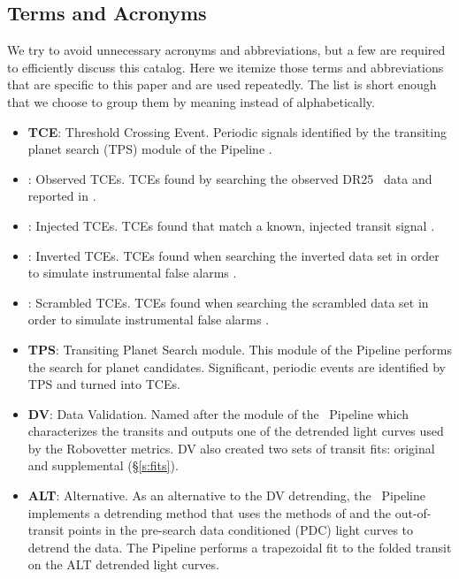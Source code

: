 \subsection{Terms and Acronyms}
\label{abbrev}
We try to avoid unnecessary acronyms and abbreviations, but a few are required to efficiently discuss this catalog.  Here we itemize those terms and abbreviations that are specific to this paper and are used repeatedly. The list is short enough that we choose to group them by meaning instead of alphabetically. 

\begin{itemize}

\item[] \textbf{TCE}: Threshold Crossing Event. Periodic signals identified by the transiting planet search (TPS) module of the \Kepler{} Pipeline \citep{JenkinsKDPH}.
\item[] \textbf{\opstce}: Observed TCEs. TCEs found by searching the observed DR25 \Kepler\ data and reported in \citet{Twicken2016}.
\item[] \textbf{\injtce}: Injected TCEs. TCEs found that match a known, injected transit signal \citep{Christiansen2017}.
\item[] \textbf{\invtce}: Inverted TCEs. TCEs found when searching the inverted data set in order to simulate instrumental false alarms \citep{Coughlin2017a}.
\item[] \textbf{\scrtce}: Scrambled TCEs. TCEs found when searching the scrambled data set in order to simulate instrumental false alarms \citep{Coughlin2017a}.
\item[] \textbf{TPS}: Transiting Planet Search module. This module of the \Kepler{} Pipeline performs the search for planet candidates. Significant, periodic events are identified by TPS and turned into TCEs.
\item[] \textbf{DV}: Data Validation. Named after the module of the \Kepler\ Pipeline \citep{JenkinsKDPH} which characterizes the transits and outputs one of the detrended light curves used by the Robovetter metrics.  DV also created two sets of transit fits: original and supplemental (\S\ref{s:fits}).
\item[] \textbf{ALT}: Alternative. As an alternative to the DV detrending, the \Kepler\ Pipeline implements a detrending method that uses the methods of \citet{Garcia2010} and the out-of-transit points in the pre-search data conditioned (PDC) light curves to detrend the data. The \Kepler{} Pipeline performs a trapezoidal fit to the folded transit on the ALT detrended light curves.

\end{itemize}
